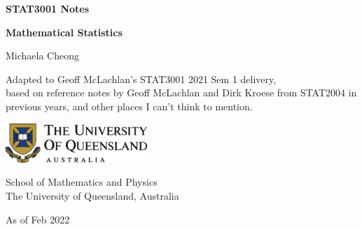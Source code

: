 \begin{titlepage}
    \begin{center}
        \vspace*{3cm}
            
        \Huge
        \textbf{STAT3001 Notes}
            
        \vspace{0.5cm}
        \LARGE
        \textbf{Mathematical Statistics}
            
        \vspace{1.5cm}
            
        Michaela Cheong
            
        \vfill

        \large
        Adapted to Geoff McLachlan's STAT3001 2021 Sem 1 delivery, \\
        based on reference notes by Geoff McLachlan and Dirk Kroese from STAT2004 in previous years, and other places I can't think to mention.
            
        \vspace{0.8cm}
            
        \includegraphics[width=0.4\textwidth]{pre/uq.png}
        
        \vspace{0.5cm}

        School of Mathematics and Physics\\
        The University of Queensland, Australia\\

        \vspace{0.8cm}

        As of Feb 2022
            
    \end{center}
\end{titlepage}

\tableofcontents